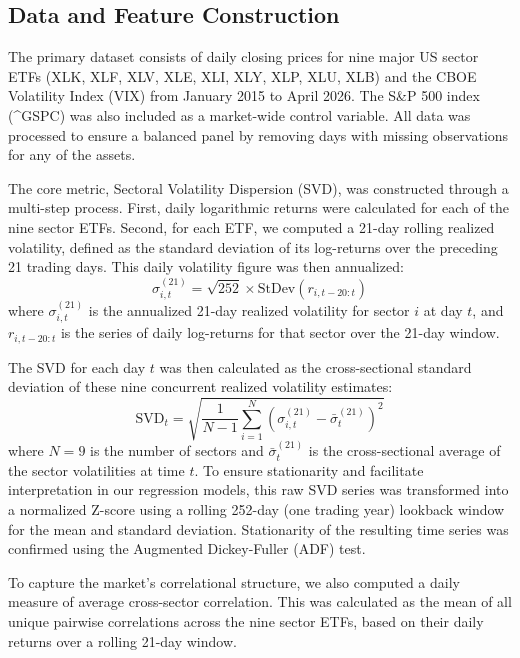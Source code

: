 \documentclass[]{article}
\begin{document}
\subsection{Data and Feature Construction}
The primary dataset consists of daily closing prices for nine major US sector ETFs (XLK, XLF, XLV, XLE, XLI, XLY, XLP, XLU, XLB) and the CBOE Volatility Index (VIX) from January 2015 to April 2026. The S\&P 500 index (\textasciicircum GSPC) was also included as a market-wide control variable. All data was processed to ensure a balanced panel by removing days with missing observations for any of the assets.

The core metric, Sectoral Volatility Dispersion (SVD), was constructed through a multi-step process. First, daily logarithmic returns were calculated for each of the nine sector ETFs. Second, for each ETF, we computed a 21-day rolling realized volatility, defined as the standard deviation of its log-returns over the preceding 21 trading days. This daily volatility figure was then annualized:
\begin{equation}
    \sigma_{i,t}^{(21)} = \sqrt{252} \times \text{StDev}(r_{i, t-20:t})
\end{equation}
where $\sigma_{i,t}^{(21)}$ is the annualized 21-day realized volatility for sector $i$ at day $t$, and $r_{i, t-20:t}$ is the series of daily log-returns for that sector over the 21-day window.

The SVD for each day $t$ was then calculated as the cross-sectional standard deviation of these nine concurrent realized volatility estimates:
\begin{equation}
    \text{SVD}_t = \sqrt{\frac{1}{N-1} \sum_{i=1}^{N} (\sigma_{i,t}^{(21)} - \bar{\sigma}_{t}^{(21)})^2}
\end{equation}
where $N=9$ is the number of sectors and $\bar{\sigma}_{t}^{(21)}$ is the cross-sectional average of the sector volatilities at time $t$. To ensure stationarity and facilitate interpretation in our regression models, this raw SVD series was transformed into a normalized Z-score using a rolling 252-day (one trading year) lookback window for the mean and standard deviation. Stationarity of the resulting time series was confirmed using the Augmented Dickey-Fuller (ADF) test.

To capture the market's correlational structure, we also computed a daily measure of average cross-sector correlation. This was calculated as the mean of all unique pairwise correlations across the nine sector ETFs, based on their daily returns over a rolling 21-day window.
\end{document}
